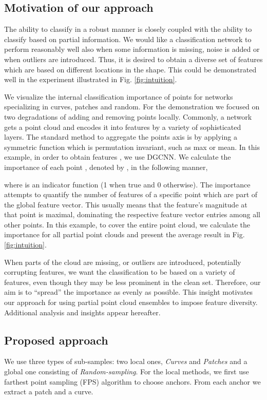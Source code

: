 \documentclass[10pt,twocolumn]{article}
\begin{document}
\subsection {Motivation of our approach}
The ability to classify in a robust manner is closely coupled with the ability to classify based on partial information. We would like a classification network to perform reasonably well also when some information is missing, noise is added or when outliers are introduced. Thus, it is desired to obtain a diverse set of features which are based on different locations in the shape. 
This could be demonstrated well in the experiment illustrated in Fig. \ref{fig:intuition}.

We visualize the internal classification importance of points for networks specializing in curves, patches and random. For the demonstration we focused on two degradations of adding and removing points locally. 
Commonly, a network gets a point cloud  and encodes it into features  by a variety of sophisticated layers. The standard method to aggregate the points axis is by applying a symmetric function which is permutation invariant, such as max or mean.
In this example, in order to obtain features , we use DGCNN\cite{dgcnn}.
We calculate the importance of each point , denoted by , in the following manner,

where   is an indicator function (1 when true and 0 otherwise).
The importance attempts to quantify the number of features of a specific point which are part of the global feature vector. This usually means that the feature's magnitude at that point is maximal, dominating the respective feature vector entries among all other points.
In this example, to cover the entire point cloud, we calculate the importance for all partial point clouds and present the average result in Fig. \ref{fig:intuition}.

When parts of the cloud are missing, or outliers are introduced, potentially corrupting features, we want the classification to be based on a variety of features, even though they may be less prominent in the clean set. Therefore, our aim is to ``spread'' the importance as evenly as possible. This insight motivates our approach for using partial point cloud ensembles to impose feature diversity. Additional analysis and insights appear hereafter.

\subsection{Proposed approach}
We use three types of sub-samples: two local ones, \emph{Curves} and \emph{Patches} and a global one consisting of \emph{Random-sampling}.
For the local methods, we first use farthest point sampling (FPS) algorithm \cite{pointnet++} to choose  anchors. From each anchor we extract a patch and a curve. 
\end{document}
